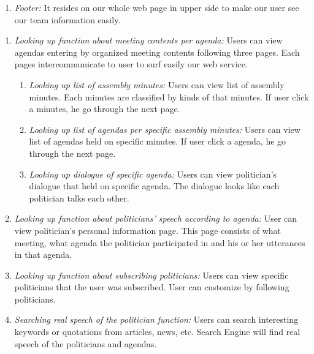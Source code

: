 \documentclass[conference]{IEEEtran}
\begin{document}
\begin{enumerate}
\begin{enumerate}
\begin{enumerate}
    \item \textit{Footer:} It resides on our whole web page in upper side to make our user see our team information easily.
    \\
        \end{enumerate}
            \end{enumerate}
    \begin{enumerate}
        \item \textit {Looking up function about meeting contents per agenda:} Users can view agendas entering by organized meeting contents following  three pages. Each pages intercommunicate to user to surf easily our web service.\\
        \begin{enumerate}
            \item \textit {Looking up list of assembly minutes:} Users can view list of assembly minutes. Each minutes are classified by kinds of that minutes. If user click a minutes, he go through the next page.\\
            \item \textit {Looking up list of agendas per specific assembly minutes:} Users can view list of agendas held on specific minutes. If user click a agenda, he go through the next page.\\
            \item \textit {Looking up dialogue of specific agenda:} Users can view politician's dialogue that held on specific agenda. The dialogue looks like each politician talks each other. \\
            
        \end{enumerate}
      
        
        \item \textit {Looking up function about politicians' speech according to agenda:} User can view politician's personal information page. This page consists of what meeting, what agenda the politician participated in and his or her utterances in that agenda.  \\
        
        \item \textit {Looking up function about subscribing politicians:} Users can view specific politicians that the user was subscribed. User can customize by following politicians.\\
        
        \item \textit {Searching real speech of the politician function:} Users can search interesting keywords or quotations from articles, news, etc. Search Engine will find real speech of the politicians and agendas. \\
        

\end{enumerate}
\end{enumerate}
\end{document}
